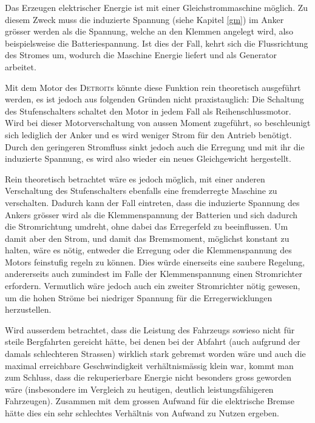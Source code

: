 Das Erzeugen elektrischer Energie ist mit einer Gleichstrommaschine möglich. Zu diesem Zweck muss die induzierte Spannung (siehe Kapitel \ref{gm}) im Anker grösser werden als die Spannung, welche an den Klemmen angelegt wird, also beispielsweise die Batteriespannung. Ist dies der Fall, kehrt sich die Flussrichtung des Stromes um, wodurch die Maschine Energie liefert und als Generator arbeitet.

Mit dem Motor des \textsc{Detroit}s könnte diese Funktion rein theoretisch ausgeführt werden, es ist jedoch aus folgenden Gründen nicht praxistauglich: Die Schaltung des Stufenschalters schaltet den Motor in jedem Fall als Reihenschlussmotor. Wird bei dieser Motorverschaltung von aussen Moment zugeführt, so beschleunigt sich lediglich der Anker und es wird weniger Strom für den Antrieb benötigt. Durch den geringeren Stromfluss sinkt jedoch auch die Erregung und mit ihr die induzierte Spannung, es wird also wieder ein neues Gleichgewicht hergestellt.

Rein theoretisch betrachtet wäre es jedoch möglich, mit einer anderen Verschaltung des Stufenschalters ebenfalls eine fremderregte Maschine zu verschalten. Dadurch kann der Fall eintreten, dass die induzierte Spannung des Ankers grösser wird als die Klemmenspannung der Batterien und sich dadurch die Stromrichtung umdreht, ohne dabei das Erregerfeld zu beeinflussen. Um damit aber den Strom, und damit das Bremsmoment, möglichst konstant zu halten, wäre es nötig, entweder die Erregung oder die Klemmenspannung des Motors feinstufig regeln zu können. Dies würde einerseits eine saubere Regelung, andererseits auch zumindest im Falle der Klemmenspannung einen Stromrichter erfordern. Vermutlich wäre jedoch auch ein zweiter Stromrichter nötig gewesen, um die hohen Ströme bei niedriger Spannung für die Erregerwicklungen herzustellen.

Wird ausserdem betrachtet, dass die Leistung des Fahrzeugs sowieso nicht für steile Bergfahrten gereicht hätte, bei denen bei der Abfahrt (auch aufgrund der damals schlechteren Strassen) wirklich stark gebremst worden wäre und auch die maximal erreichbare Geschwindigkeit verhältnismässig klein war, kommt man zum Schluss, dass die rekuperierbare Energie nicht besonders gross geworden wäre (insbesondere im Vergleich zu heutigen, deutlich leistungsfähigeren Fahrzeugen). Zusammen mit dem grossen Aufwand für die elektrische Bremse hätte dies ein sehr schlechtes Verhältnis von Aufwand zu Nutzen ergeben.